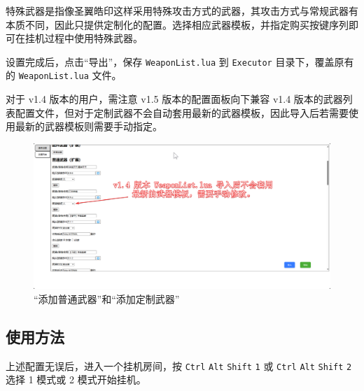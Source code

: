 特殊武器是指像圣翼皓印这样采用特殊攻击方式的武器，其攻击方式与常规武器有本质不同，因此只提供定制化的配置。选择相应武器模板，并指定购买按键序列即可在挂机过程中使用特殊武器。

设置完成后，点击“导出”，保存 \lstinline{WeaponList.lua} 到 \lstinline{Executor} 目录下，覆盖原有的 \lstinline{WeaponList.lua} 文件。

对于 v1.4 版本的用户，需注意 v1.5 版本的配置面板向下兼容 v1.4 版本的武器列表配置文件，但对于定制武器不会自动套用最新的武器模板，因此导入后若需要使用最新的武器模板则需要手动指定。

\begin{figure}[H]
    \Centering
    \includegraphics[width=\textwidth]{assets/weapons_for_previous_versions}
    \caption{“添加普通武器”和“添加定制武器”}
\end{figure}

\subsection{使用方法}

上述配置无误后，进入一个挂机房间，按 \lstinline{Ctrl} \lstinline{Alt} \lstinline{Shift} \lstinline{1} 或 \lstinline{Ctrl} \lstinline{Alt} \lstinline{Shift} \lstinline{2} 选择 1 模式或 2 模式开始挂机。